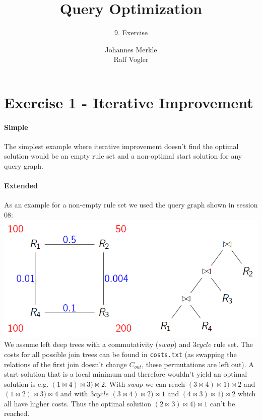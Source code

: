 \documentclass[11pt,a4paper]{scrartcl}
\begin{document}
\author{Johannes Merkle\\Ralf Vogler}
\title{Query Optimization}
\subtitle{9. Exercise}

\maketitle

\section*{Exercise 1 - Iterative Improvement}
\paragraph*{Simple}
The simplest example where iterative improvement doesn't find the optimal solution would be an empty rule set and a non-optimal start solution for any query graph.

\paragraph*{Extended}
As an example for a non-empty rule set we used the query graph shown in session 08:\\
\includegraphics[scale=.8]{graph-and-tree}\\
We assume left deep trees with a commutativity ($swap$) and $3cycle$  rule set.
The costs for all possible join trees can be found in \verb|costs.txt| (as swapping the relations of the first join doesn't change $C_{out}$, these permutations are left out).
A start solution that is a local minimum and therefore wouldn't yield an optimal solution is e.g. $(1 \Join 4)\Join 3)\Join 2$. With $swap$ we can reach $(3 \Join 4)\Join 1)\Join 2$ and $(1 \Join 2)\Join 3)\Join 4$ and with $3cycle$ $(3 \Join 4)\Join 2)\Join 1$ and $(4 \Join 3)\Join 1)\Join 2$ which all have higher costs. Thus the optimal solution $(2 \Join 3)\Join 4)\Join 1$ can't be reached.
\end{document}
